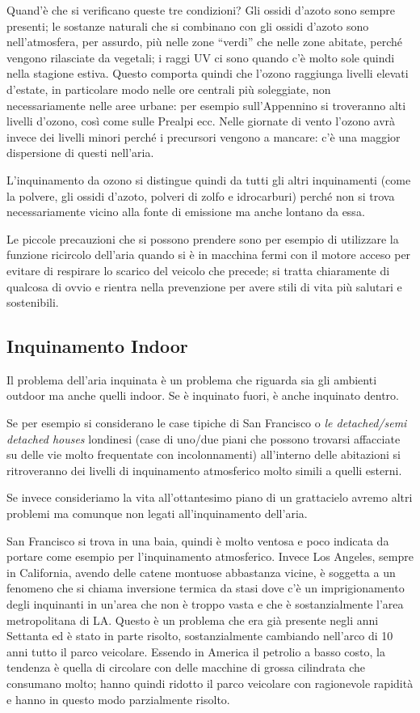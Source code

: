 Quand'è che si verificano queste tre condizioni? Gli ossidi d'azoto sono
sempre presenti; le sostanze naturali che si combinano con gli ossidi
d'azoto sono nell'atmosfera, per assurdo, più nelle zone ``verdi'' che
nelle zone abitate, perché vengono rilasciate da vegetali; i raggi UV ci
sono quando c'è molto sole quindi nella stagione estiva. Questo comporta
quindi che l'ozono raggiunga livelli elevati d'estate, in particolare
modo nelle ore centrali più soleggiate, non necessariamente nelle aree
urbane: per esempio sull'Appennino si troveranno alti livelli d'ozono,
così come sulle Prealpi ecc. Nelle giornate di vento l'ozono avrà invece
dei livelli minori perché i precursori vengono a mancare: c'è una
maggior dispersione di questi nell'aria.

L'inquinamento da ozono si distingue quindi da tutti gli altri
inquinamenti (come la polvere, gli ossidi d'azoto, polveri di zolfo e
idrocarburi) perché non si trova necessariamente vicino alla fonte di
emissione ma anche lontano da essa.

Le piccole precauzioni che si possono prendere sono per esempio di
utilizzare la funzione ricircolo dell'aria quando si è in macchina fermi
con il motore acceso per evitare di respirare lo scarico del veicolo che
precede; si tratta chiaramente di qualcosa di ovvio e rientra nella
prevenzione per avere stili di vita più salutari e sostenibili.

\subsection{Inquinamento Indoor}


Il problema dell'aria inquinata è un problema che riguarda sia gli
ambienti outdoor ma anche quelli indoor. Se è inquinato fuori, è anche
inquinato dentro.

Se per esempio si considerano le case tipiche di San Francisco o
\emph{le detached/semi detached houses} londinesi (case di uno/due piani
che possono trovarsi affacciate su delle vie molto frequentate con
incolonnamenti) all'interno delle abitazioni si ritroveranno dei livelli
di inquinamento atmosferico molto simili a quelli esterni.

Se invece consideriamo la vita all'ottantesimo piano di un grattacielo
avremo altri problemi ma comunque non legati all'inquinamento dell'aria.

San Francisco si trova in una baia, quindi è molto ventosa e poco
indicata da portare come esempio per l'inquinamento atmosferico. Invece
Los Angeles, sempre in California, avendo delle catene montuose
abbastanza vicine, è soggetta a un fenomeno che si chiama inversione
termica da stasi dove c'è un imprigionamento degli inquinanti in un'area
che non è troppo vasta e che è sostanzialmente l'area metropolitana di
LA. Questo è un problema che era già presente negli anni Settanta ed è
stato in parte risolto, sostanzialmente cambiando nell'arco di 10 anni
tutto il parco veicolare. Essendo in America il petrolio a basso costo,
la tendenza è quella di circolare con delle macchine di grossa
cilindrata che consumano molto; hanno quindi ridotto il parco veicolare
con ragionevole rapidità e hanno in questo modo parzialmente risolto.

